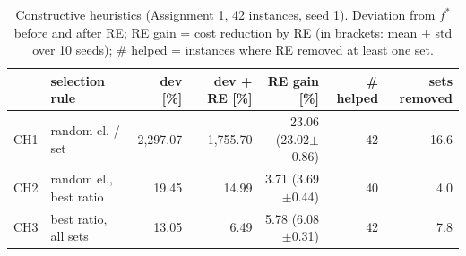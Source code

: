 \begin{table}[t]
\centering\small
\setlength{\tabcolsep}{5pt}
\caption{Constructive heuristics (Assignment 1, 42 instances, seed 1). Deviation from $f^*$ before and after RE; RE gain = cost reduction by RE (in brackets: mean $\pm$ std over 10 seeds); \# helped = instances where RE removed at least one set.}
\label{tab:construct}
\begin{tabular}{llrrrrr}
\toprule
 & selection rule & dev [\%] & dev + RE [\%] & RE gain [\%] & \# helped & sets removed \\
\midrule
CH1 & random el. / set & 2,297.07 & 1,755.70 & 23.06 (23.02$\pm$0.86) & 42 & 16.6 \\
CH2 & random el., best ratio & 19.45 & 14.99 & 3.71 (3.69$\pm$0.44) & 40 & 4.0 \\
CH3 & best ratio, all sets & 13.05 & 6.49 & 5.78 (6.08$\pm$0.31) & 42 & 7.8 \\
\bottomrule
\end{tabular}
\end{table}

